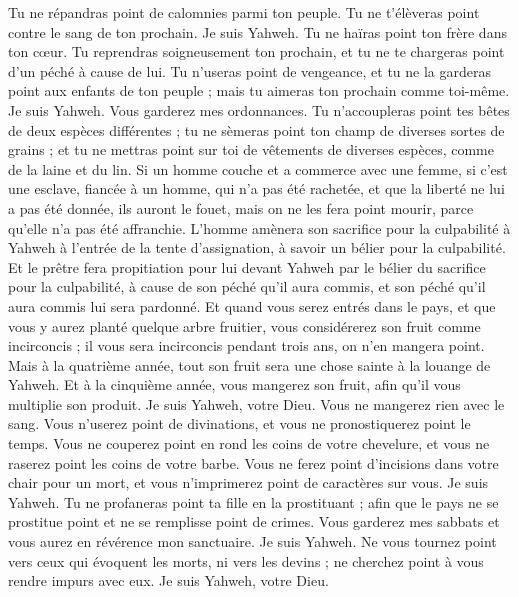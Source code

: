 \begin{multicols}{2}
Tu ne répandras point de calomnies parmi ton peuple. Tu ne t'élèveras point contre le sang de ton prochain. Je suis Yahweh.
Tu ne haïras point ton frère dans ton cœur. Tu reprendras soigneusement ton prochain, et tu ne te chargeras point d'un péché à cause de lui.
Tu n'useras point de vengeance, et tu ne la garderas point aux enfants de ton peuple ; mais tu aimeras ton prochain comme toi-même. Je suis Yahweh.
Vous garderez mes ordonnances. Tu n'accoupleras point tes bêtes de deux espèces différentes ; tu ne sèmeras point ton champ de diverses sortes de grains ; et tu ne mettras point sur toi de vêtements de diverses espèces, comme de la laine et du lin.
Si un homme couche et a commerce avec une femme, si c'est une esclave, fiancée à un homme, qui n'a pas été rachetée, et que la liberté ne lui a pas été donnée, ils auront le fouet, mais on ne les fera point mourir, parce qu'elle n'a pas été affranchie.
L'homme amènera son sacrifice pour la culpabilité à Yahweh à l'entrée de la tente d'assignation, à savoir un bélier pour la culpabilité.
Et le prêtre fera propitiation pour lui devant Yahweh par le bélier du sacrifice pour la culpabilité, à cause de son péché qu'il aura commis, et son péché qu'il aura commis lui sera pardonné.
Et quand vous serez entrés dans le pays, et que vous y aurez planté quelque arbre fruitier, vous considérerez son fruit comme incirconcis ; il vous sera incirconcis pendant trois ans, on n'en mangera point.
Mais à la quatrième année, tout son fruit sera une chose sainte à la louange de Yahweh.
Et à la cinquième année, vous mangerez son fruit, afin qu'il vous multiplie son produit. Je suis Yahweh, votre Dieu.
Vous ne mangerez rien avec le sang. Vous n'userez point de divinations, et vous ne pronostiquerez point le temps.
Vous ne couperez point en rond les coins de votre chevelure, et vous ne raserez point les coins de votre barbe.
Vous ne ferez point d'incisions dans votre chair pour un mort, et vous n'imprimerez point de caractères sur vous. Je suis Yahweh.
Tu ne profaneras point ta fille en la prostituant ; afin que le pays ne se prostitue point et ne se remplisse point de crimes.
Vous garderez mes sabbats et vous aurez en révérence mon sanctuaire. Je suis Yahweh.
Ne vous tournez point vers ceux qui évoquent les morts, ni vers les devins ; ne cherchez point à vous rendre impurs avec eux. Je suis Yahweh, votre Dieu.

\end{multicols}
